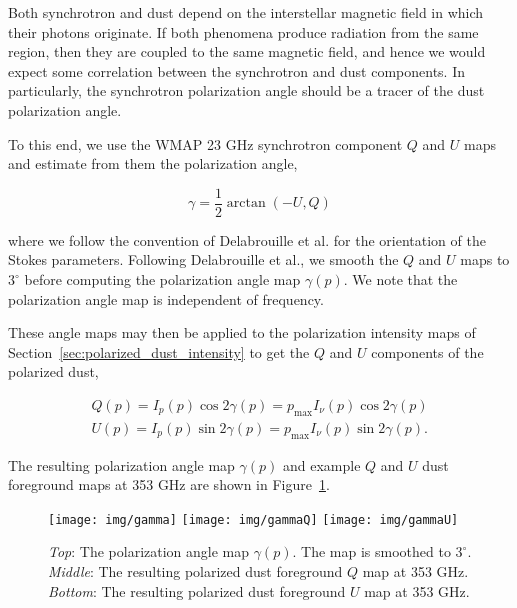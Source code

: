 \documentclass[twoside,10pt]{article}
\begin{document}
Both synchrotron\cite{rybicki_radiative_1985} and
dust\cite{lazarian_tracing_2007} depend on the interstellar magnetic field in
which their photons originate. If both phenomena produce radiation from the
same region, then they are coupled to the same magnetic field, and hence we
would expect some correlation between the synchrotron and dust components. In
particularly, the synchrotron polarization angle should be a tracer of the
dust polarization angle\cite{delabrouille_pre-launch_2013}.

To this end, we use the WMAP 23 GHz synchrotron component $Q$ and $U$ maps
and estimate from them the polarization angle,

\begin{equation}
    \gamma = \frac{1}{2} \arctan{\left( -U, Q \right)}
\end{equation}

where we follow the convention of Delabrouille et al. for the orientation of
the Stokes parameters. Following Delabrouille et al., we smooth the $Q$ and
$U$ maps to $3^\circ$ before computing the polarization angle map $\gamma(p)$.
We note that the polarization angle map is independent of frequency.

These angle maps may then be applied to the polarization intensity maps of
Section~\ref{sec:polarized_dust_intensity} to get the $Q$ and $U$ components
of the polarized dust,

\begin{align}
    Q(p) = I_p(p) \cos{2\gamma(p)} = p_\mathrm{max} I_\nu(p) \cos{2\gamma(p)}\\
    U(p) = I_p(p) \sin{2\gamma(p)} = p_\mathrm{max} I_\nu(p) \sin{2\gamma(p)}.
\end{align}

The resulting polarization angle map $\gamma(p)$ and example $Q$ and $U$ dust
foreground maps at 353 GHz are shown in Figure~\ref{fig:gammaQU}.

\begin{figure}[th]
    \begin{center}
        \texttt{[image: img/gamma]}
        \texttt{[image: img/gammaQ]}
        \texttt{[image: img/gammaU]}
    \end{center}
    \caption{\emph{Top}: The polarization angle map $\gamma(p)$. The map is
    smoothed to $3^\circ$. \emph{Middle}: The resulting polarized dust
    foreground $Q$ map at 353 GHz. \emph{Bottom}: The resulting polarized
    dust foreground $U$ map at 353 GHz.}
    \label{fig:gammaQU}
\end{figure}
\end{document}
